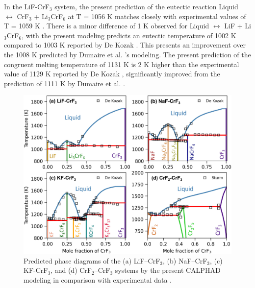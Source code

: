 In the LiF-CrF$_3$ system, the present prediction of the eutectic reaction Liquid $\leftrightarrow$ CrF$_3$ + Li$_3$CrF$_6$ at T = 1056 K matches closely with experimental values of T = 1059 K \cite{DeKozak1969}. There is a minor difference of 1 K observed for Liquid $\leftrightarrow$ LiF + Li$_3$CrF$_6$, with the present modeling predicts an eutectic temperature of 1002 K compared to 1003 K reported by De Kozak \cite{DeKozak1969}. This presents an improvement over the 1008 K predicted by Dumaire et al. \cite{dumaire2021thermodynamic}’s modeling. The present prediction of the congruent melting temperature of 1131 K is 2 K higher than the experimental value of 1129 K reported by De Kozak \cite{DeKozak1969}, significantly improved from the prediction of 1111 K by Dumaire et al. \cite{dumaire2021thermodynamic}. 

\begin{figure}[H]
    \centering
    \includegraphics[width=0.9\linewidth]{moltensalts/Moltensalts-FLiNaKCr-Phasediagram.jpg}
    \caption{Predicted phase diagrams of the (a) LiF–CrF$_3$, (b) NaF–CrF$_3$, (c) KF-CrF$_3$, and (d) CrF$_2$–CrF$_3$ systems by the present CALPHAD modeling in comparison with experimental data \cite{de1975systeme, DeKozak1969, sturm1962phase}.}
    \label{ms:fig:FLiNaKCr-Phasediagram}
\end{figure}


